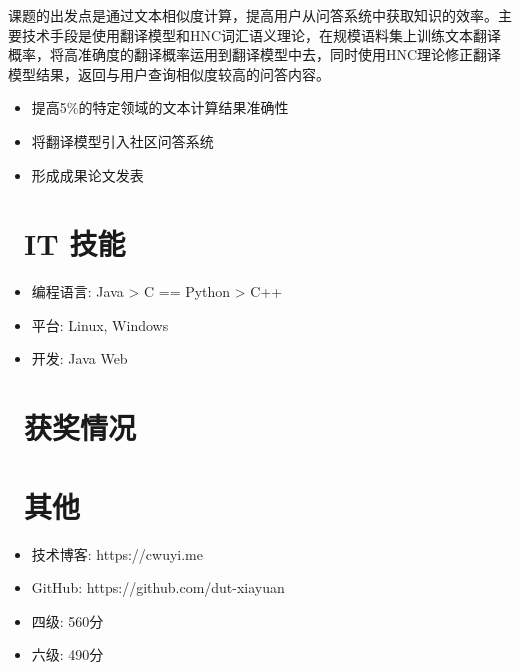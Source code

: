 \documentclass{resume}
\begin{document}
\begin{onehalfspacing}
课题的出发点是通过文本相似度计算，提高用户从问答系统中获取知识的效率。主要技术手段是使用翻译模型和HNC词汇语义理论，在规模语料集上训练文本翻译概率，将高准确度的翻译概率运用到翻译模型中去，同时使用HNC理论修正翻译模型结果，返回与用户查询相似度较高的问答内容。
\begin{itemize}
  \item 提高5\%的特定领域的文本计算结果准确性
  \item 将翻译模型引入社区问答系统
  \item 形成成果论文发表
\end{itemize}
\end{onehalfspacing}

\section{\faCogs\ IT 技能}
\begin{itemize}[parsep=0.5ex]
  \item 编程语言: Java > C == Python > C++
  \item 平台: Linux, Windows
  \item 开发: Java Web
\end{itemize}

\section{\faHeartO\ 获奖情况}

\section{\faInfo\ 其他}
\begin{itemize}[parsep=0.5ex]
  \item 技术博客: https://cwuyi.me
  \item GitHub: https://github.com/dut-xiayuan
  \item 四级: 560分
  \item 六级: 490分
\end{itemize}
\end{document}
